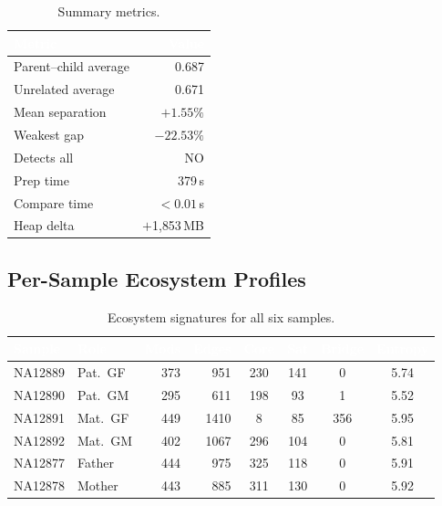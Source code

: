 \documentclass{../yalumba}
\begin{document}
\begin{table}[H]
  \centering
  \tablestyle
  \caption{Summary metrics.}
  \label{tab:summary}
  \begin{tabular}{lr}
    \toprule
    \rowcolor{table-header}
    \textcolor{white}{\textbf{Metric}} &
    \textcolor{white}{\textbf{Value}} \\
    \midrule
    Parent--child average & 0.687 \\
    Unrelated average & 0.671 \\
    Mean separation & $+1.55\%$ \\
    Weakest gap & $-22.53\%$ \\
    Detects all & NO \\
    Prep time & 379\,s \\
    Compare time & $<0.01$\,s \\
    Heap delta & $+$1{,}853\,MB \\
    \bottomrule
  \end{tabular}
\end{table}

\subsection{Per-Sample Ecosystem Profiles}

\begin{table}[H]
  \centering
  \tablestyle
  \caption{Ecosystem signatures for all six samples.}
  \label{tab:ecosystems}
  \begin{tabular}{llrrcccc}
    \toprule
    \rowcolor{table-header}
    \textcolor{white}{\textbf{Sample}} &
    \textcolor{white}{\textbf{Role}} &
    \textcolor{white}{\textbf{Mods}} &
    \textcolor{white}{\textbf{Edges}} &
    \textcolor{white}{\textbf{Core}} &
    \textcolor{white}{\textbf{Sat}} &
    \textcolor{white}{\textbf{Bridge}} &
    \textcolor{white}{\textbf{Entropy}} \\
    \midrule
    NA12889 & Pat.\ GF & 373 & 951  & 230 & 141 & 0   & 5.74 \\
    NA12890 & Pat.\ GM & 295 & 611  & 198 & 93  & 1   & 5.52 \\
    NA12891 & Mat.\ GF & 449 & 1410 & 8   & 85  & 356 & 5.95 \\
    NA12892 & Mat.\ GM & 402 & 1067 & 296 & 104 & 0   & 5.81 \\
    NA12877 & Father   & 444 & 975  & 325 & 118 & 0   & 5.91 \\
    NA12878 & Mother   & 443 & 885  & 311 & 130 & 0   & 5.92 \\
    \bottomrule
  \end{tabular}
\end{table}
\end{document}
